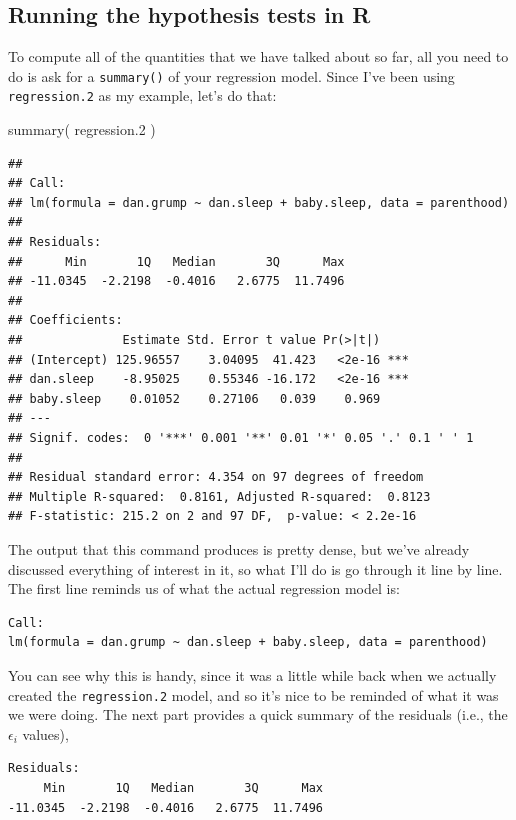 \documentclass[
]{book}
\newenvironment{Shaded}{\begin{snugshade}}{\end{snugshade}}
\newcommand{\FloatTok}[1]{\textcolor[rgb]{0.00,0.00,0.81}{#1}}
\newcommand{\FunctionTok}[1]{\textcolor[rgb]{0.00,0.00,0.00}{#1}}
\newcommand{\NormalTok}[1]{#1}
\begin{document}
\hypertarget{regressionsummary}{%
\subsection{Running the hypothesis tests in R}\label{regressionsummary}}

To compute all of the quantities that we have talked about so far, all you need to do is ask for a \texttt{summary()} of your regression model. Since I've been using \texttt{regression.2} as my example, let's do that:

\begin{Shaded}
\begin{Highlighting}[]
\FunctionTok{summary}\NormalTok{( regression}\FloatTok{.2}\NormalTok{ )}
\end{Highlighting}
\end{Shaded}

\begin{verbatim}
## 
## Call:
## lm(formula = dan.grump ~ dan.sleep + baby.sleep, data = parenthood)
## 
## Residuals:
##      Min       1Q   Median       3Q      Max 
## -11.0345  -2.2198  -0.4016   2.6775  11.7496 
## 
## Coefficients:
##              Estimate Std. Error t value Pr(>|t|)    
## (Intercept) 125.96557    3.04095  41.423   <2e-16 ***
## dan.sleep    -8.95025    0.55346 -16.172   <2e-16 ***
## baby.sleep    0.01052    0.27106   0.039    0.969    
## ---
## Signif. codes:  0 '***' 0.001 '**' 0.01 '*' 0.05 '.' 0.1 ' ' 1
## 
## Residual standard error: 4.354 on 97 degrees of freedom
## Multiple R-squared:  0.8161, Adjusted R-squared:  0.8123 
## F-statistic: 215.2 on 2 and 97 DF,  p-value: < 2.2e-16
\end{verbatim}

The output that this command produces is pretty dense, but we've already discussed everything of interest in it, so what I'll do is go through it line by line. The first line reminds us of what the actual regression model is:

\begin{verbatim}
Call:
lm(formula = dan.grump ~ dan.sleep + baby.sleep, data = parenthood)
\end{verbatim}

You can see why this is handy, since it was a little while back when we actually created the \texttt{regression.2} model, and so it's nice to be reminded of what it was we were doing. The next part provides a quick summary of the residuals (i.e., the \(\epsilon_i\) values),

\begin{verbatim}
Residuals:
     Min       1Q   Median       3Q      Max 
-11.0345  -2.2198  -0.4016   2.6775  11.7496 
\end{verbatim}
\end{document}
